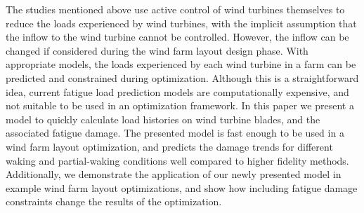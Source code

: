 \documentclass[11pt,letterpaper]{article}
\begin{document}
The studies mentioned above use active control of wind turbines themselves to reduce the loads experienced by wind turbines, with the implicit assumption that the inflow to the wind turbine cannot be controlled. 
However, the inflow can be changed if considered during the wind farm layout design phase.
With appropriate models, the loads experienced by each wind turbine in a farm can be predicted and constrained during optimization. 
Although this is a straightforward idea, current fatigue load prediction models are computationally expensive, and not suitable to be used in an optimization framework.
% 
In this paper we present a model to quickly calculate load histories on wind turbine blades, and the associated fatigue damage. The presented model is fast enough to be used in a wind farm layout optimization, and predicts the damage trends for different waking and partial-waking conditions well compared to higher fidelity methods. 
% 
Additionally, we demonstrate the application of our newly presented model in example wind farm layout optimizations, and show how including fatigue damage constraints change the results of the optimization.

% 
% 
\end{document}
